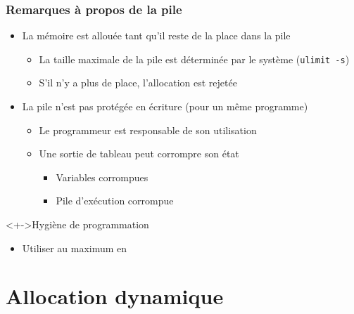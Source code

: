 \begin{frame}
\frametitle{Remarques à propos de la pile}
\begin{itemize}[<+->]
\item La mémoire est allouée tant qu'il reste de la place dans la pile
	\begin{itemize}
	\item La taille maximale de la pile est déterminée par le système (\texttt{ulimit -s})
	\item S'il n'y a plus de place, l'allocation est rejetée	
	\end{itemize}
\item La pile n'est pas protégée en écriture (pour un même programme)
	\begin{itemize}
	\item Le programmeur est responsable de son utilisation
	\item Une sortie de tableau peut corrompre son état
		\begin{itemize}
		\item Variables corrompues
		\item Pile d'exécution corrompue
		\end{itemize}
	\end{itemize}
\end{itemize}
\begin{block}<+->{Hygiène de programmation}
	\begin{itemize}
	\item Utiliser au maximum en \cpp
	\end{itemize}
\end{block}
\end{frame}

\section{Allocation dynamique}

